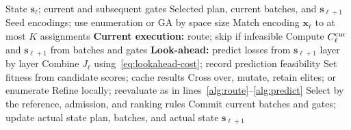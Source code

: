 \begin{algorithm}[!t]
\caption{Genetic Search with Multi-Layer Look-Ahead}
\label{alg:solver}
\PaperAlgorithmSetup
\algrenewcommand{}
\algrenewcommand{}
\begin{algorithmic}[1]
\Require State $\mathbf{s}_\ell$; current and subsequent gates
\Ensure Selected plan, current batches, and $\mathbf{s}_{\ell+1}$
\State Seed encodings; use enumeration or GA by space size
  \State Match encoding $\mathbf x_\ell$ to at most $K$ assignments
    \State \textbf{Current execution:} route; skip if infeasible \label{alg:route}
    \State Compute $C_\ell^{\rm cur}$ and $\mathbf{s}_{\ell+1}$ from batches and gates
    \State \textbf{Look-ahead:} predict losses from $\mathbf{s}_{\ell+1}$ layer by layer
    \State Combine $J_\ell$ using~\eqref{eq:lookahead-cost}; record prediction feasibility \label{alg:predict}
  \EndFor
  \State Set fitness from candidate scores; cache results
  \State Cross over, mutate, retain elites; or enumerate
\EndWhile
\State Refine locally; reevaluate as in lines~\ref{alg:route}--\ref{alg:predict}
\State Select by the reference, admission, and ranking rules
\State Commit current batches and gates; update actual state
\State \Return plan, batches, and actual state $\mathbf{s}_{\ell+1}$
\end{algorithmic}
\end{algorithm}
